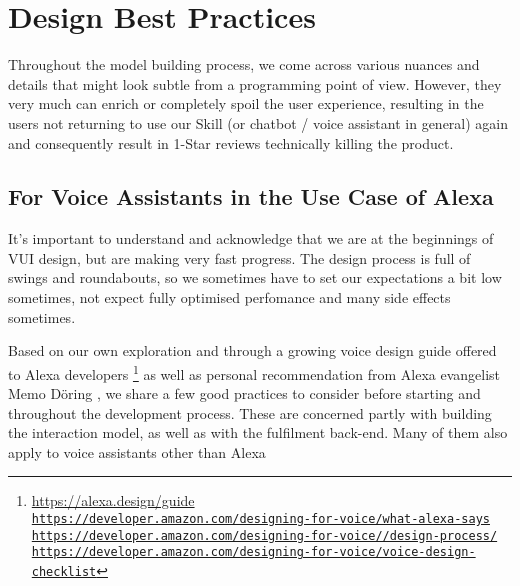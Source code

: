 \chapter{Design Best Practices}
\label{designbestprac}


Throughout the model building process, we come across various nuances and details that might look subtle from a programming point of view. However, they very much can enrich or completely spoil the user experience, resulting in the users not returning to use our Skill (or chatbot / voice assistant in general) again and consequently result in 1-Star reviews technically killing the product.



\section{For Voice Assistants in the Use Case of Alexa}
\label{designalexa:bestprac}





It's important to understand and acknowledge that we are at the beginnings of VUI design, but are making very fast progress. The design process is full of swings and roundabouts, so we sometimes have to set our expectations a bit low sometimes, not expect fully optimised perfomance and many side effects sometimes.
  
Based on our own exploration and through a growing voice design guide offered to Alexa developers \footnote{\url{https://alexa.design/guide} \\ \href{https://developer.amazon.com/designing-for-voice/what-alexa-says/}{\lstinline|https://developer.amazon.com/designing-for-voice/what-alexa-says|}\\
	\href{https://developer.amazon.com/designing-for-voice/design-process/}{\lstinline|https://developer.amazon.com/designing-for-voice//design-process/|}\\
	\href{https://developer.amazon.com/designing-for-voice/voice-design-checklist}{\lstinline|https://developer.amazon.com/designing-for-voice/voice-design-checklist|}
} as well as personal recommendation from Alexa evangelist Memo Döring \cite{memo:devDay}, we share a few good practices to consider before starting and throughout the development process. These are concerned partly with building the interaction model, as well as with the fulfilment back-end. Many of them also apply to voice assistants other than Alexa







